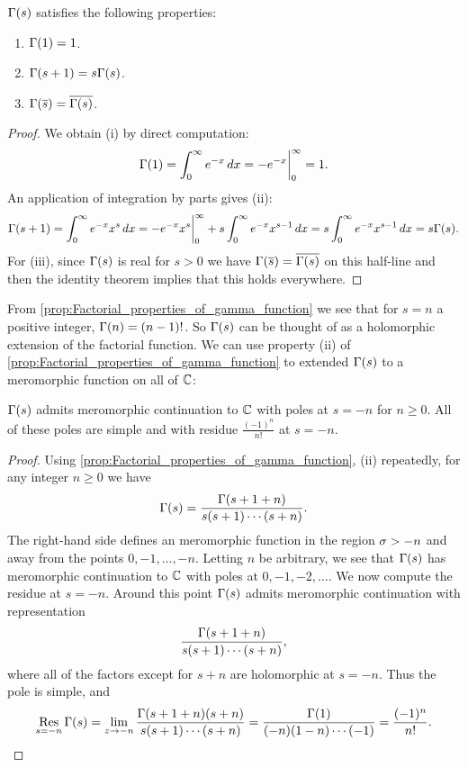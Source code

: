     \begin{proposition}\label{prop:Factorial_properties_of_gamma_function}
      $\Gamma(s)$ satisfies the following properties:
      \begin{enumerate}[label*=(\roman*)]
        \item $\Gamma(1) = 1$.
        \item $\Gamma(s+1) = s\Gamma(s)$.
        \item $\Gamma(\overline{s}) = \overline{\Gamma(s)}$.
      \end{enumerate}
    \end{proposition}
    \begin{proof}
      We obtain (i) by direct computation:
      \[
        \Gamma(1) = \int_{0}^{\infty}e^{-x}\,dx = -e^{-x}\bigg|_{0}^{\infty} = 1.
      \]
      An application of integration by parts gives (ii):
      \[
        \Gamma(s+1) = \int_{0}^{\infty}e^{-x}x^{s}\,dx = -e^{-x}x^{s}\bigg|_{0}^{\infty}+s\int_{0}^{\infty}e^{-x}x^{s-1}\,dx = s\int_{0}^{\infty}e^{-x}x^{s-1}\,dx = s\Gamma(s).
      \]
      For (iii), since $\Gamma(s)$ is real for $s >0$ we have $\Gamma(\overline{s}) = \overline{\Gamma(s)}$ on this half-line and then the identity theorem implies that this holds everywhere.
    \end{proof}

    From \cref{prop:Factorial_properties_of_gamma_function} we see that for $s = n$ a positive integer, $\Gamma(n) = (n-1)!$. So $\Gamma(s)$ can be thought of as a holomorphic extension of the factorial function. We can use property (ii) of \cref{prop:Factorial_properties_of_gamma_function} to extended $\Gamma(s)$ to a meromorphic function on all of $\mathbb{C}$:

    \begin{theorem}\label{thm:continuation_of_gamma_function}
      $\Gamma(s)$ admits meromorphic continuation to $\mathbb{C}$ with poles at $s = -n$ for $n \ge 0$. All of these poles are simple and with residue $\frac{(-1)^{n}}{n!}$ at $s = -n$.
    \end{theorem}
    \begin{proof}
      Using \cref{prop:Factorial_properties_of_gamma_function}, (ii) repeatedly, for any integer $n \ge 0$ we have
      \[
        \Gamma(s) = \frac{\Gamma(s+1+n)}{s(s+1) \cdots (s+n)}.
      \]
      The right-hand side defines an meromorphic function in the region $\sigma > -n$ and away from the points $0,-1,\ldots,-n$. Letting $n$ be arbitrary, we see that $\Gamma(s)$ has meromorphic continuation to $\mathbb{C}$ with poles at $0,-1,-2,\ldots$. We now compute the residue at $s = -n$. Around this point $\Gamma(s)$ admits meromorphic continuation with representation
      \[
        \frac{\Gamma(s+1+n)}{s(s+1) \cdots (s+n)},
      \]
      where all of the factors except for $s+n$ are holomorphic at $s = -n$. Thus the pole is simple, and
      \[
        \operatorname*{\mathrm{Res}}_{s = -n}\Gamma(s) = \lim_{z \to -n}\frac{\Gamma(s+1+n)(s+n)}{s(s+1) \cdots (s+n)} = \frac{\Gamma(1)}{(-n)(1-n) \cdots (-1)} = \frac{(-1)^{n}}{n!}.
      \]
    \end{proof}

